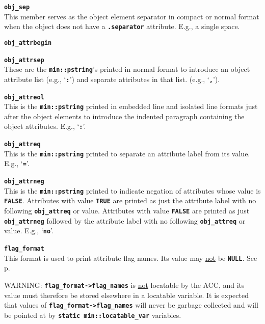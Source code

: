 \documentclass[12pt]{article}
\makeatletter
\newcommand{\TT}[1]{{\tt \bfseries #1}}
\newcommand{\ttmkey}[2]{\TT{#1}\index{#1@{\tt #1}!#2}}
\newcommand{\pagref}[1]{p\pageref{#1}}
\newcommand{\EOL}{\penalty \exhyphenpenalty}
\newenvironment{itemlist}[1][1.2in]%
	{\begin{list}{}{\setlength{\labelwidth}{#1}%
		        \setlength{\leftmargin}{\labelwidth}%
		        \addtolength{\leftmargin}{+0.2in}%
		        \renewcommand{\makelabel}[1]{##1\hfill}}}%
	{\end{list}}
\makeatother
\begin{document}
\begin{itemlist}[0.2in]
\item[\ttmkey{obj\_sep}{in {\tt min::obj\_format}}]~\\
This member serves as the object element separator in compact
or normal format when the object does
not have a \TT{.separator} attribute.  E.g., a single space.

\item[\ttmkey{obj\_attrbegin}{in {\tt min::obj\_format}}]
\item[\ttmkey{obj\_attrsep}{in {\tt min::obj\_format}}]\vspace{-2ex}~\\
These are the \TT{min::pstring}'s printed in normal format to introduce
an object attribute list (e.g., `\TT{:}')
and separate attributes in that list. (e.g., `\TT{,}').

\item[\ttmkey{obj\_attreol}{in {\tt min::obj\_format}}]~\\
This is the \TT{min::pstring} printed in embedded line and isolated line
formats just after the object elements
to introduce the indented paragraph containing the object attributes.
E.g., `\TT{:}'.

\item[\ttmkey{obj\_attreq}{in {\tt min::obj\_format}}]~\\
This is the \TT{min::pstring} printed to
separate an attribute label from its value.  E.g., `\TT{=}'.

\item[\ttmkey{obj\_attrneg}{in {\tt min::obj\_format}}]~\\
This is the \TT{min::pstring} printed to indicate
negation of attributes whose value is \TT{FALSE}.
Attributes with value \TT{TRUE} are printed as just
the attribute label with no following \TT{obj\_\EOL attreq} or value.
Attributes with value \TT{FALSE} are printed as just
\TT{obj\_\EOL attrneg} followed by
the attribute label with no following \TT{obj\_\EOL attreq} or value.
E.g., `\TT{no\textvisiblespace}'.

\item[\ttmkey{flag\_format}{in {\tt min::obj\_format}}]~\\
This format is used to print attribute flag names.  Its value may
\underline{not} be \TT{NULL}.  See \pagref{ATTRIBUTE-FLAG-NAMES}.

WARNING: \TT{flag\_format->flag\_names} is
\underline{not} locatable by the ACC, and its value must therefore be
stored elsewhere in a locatable variable.  It is expected that values of
\TT{flag\_\EOL format->\EOL flag\_\EOL names} will never be garbage
collected and will be pointed at by
\TT{static min::\EOL locatable\_\EOL var} variables.


\end{itemlist}
\end{document}
